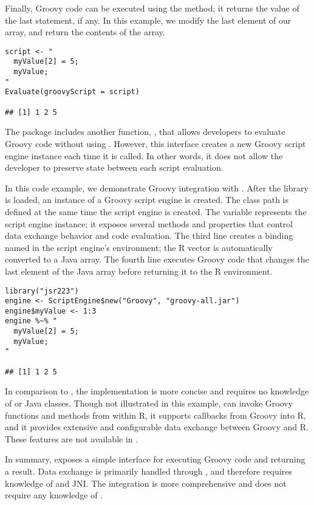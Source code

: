 Finally, Groovy code can be executed using the  method; it returns the value of the last statement, if any. In this example, we modify the last element of our  array, and return the contents of the array.

\begin{verbatim}
script <- "
  myValue[2] = 5;
  myValue;
"
Evaluate(groovyScript = script)

## [1] 1 2 5
\end{verbatim}

The  package includes another function, , that allows developers to evaluate Groovy code without using . However, this interface creates a new Groovy script engine instance each time it is called. In other words, it does not allow the developer to preserve state between each script evaluation.

In this code example, we demonstrate Groovy integration with . After the library is loaded, an instance of a Groovy script engine is created. The class path is defined at the same time the script engine is created. The variable  represents the script engine instance; it exposes several methods and properties that control data exchange behavior and code evaluation. The third line creates a binding named  in the script engine's environment; the R vector is automatically converted to a Java array. The fourth line executes Groovy code that changes the last element of the  Java array before returning it to the R environment.

\begin{verbatim}
library("jsr223")
engine <- ScriptEngine$new("Groovy", "groovy-all.jar")
engine$myValue <- 1:3
engine %~% "
  myValue[2] = 5;
  myValue;
"

## [1] 1 2 5
\end{verbatim}

In comparison to , the  implementation is more concise and requires no knowledge of  or Java classes. Though not illustrated in this example,  can invoke Groovy functions and methods from within R, it supports callbacks from Groovy into R, and it provides extensive and configurable data exchange between Groovy and R. These features are not available in .

In summary,  exposes a simple interface for executing Groovy code and returning a result. Data exchange is primarily handled through , and therefore requires knowledge of  and JNI. The  integration is more comprehensive and does not require any knowledge of .

